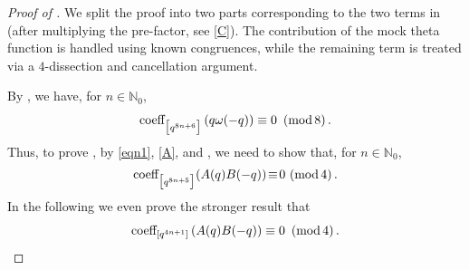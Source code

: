 \documentclass[12pt,reqno]{amsart}
\renewcommand{\o}{{\omega}}
\renewcommand{\(}{\left\(}
\renewcommand{\)}{\right\)}
\newcommand{\os}[2]{\overset{#1}{#2}}
\numberwithin{equation}{section}
\theoremstyle{plain}
\theoremstyle{definition}
\numberwithin{equation}{section}
\renewcommand{\pmod}[1]{\ \left( \mathrm{mod} \, #1 \right)}
\begin{document}
\begin{proof}[Proof of ]
We split the proof into two parts corresponding to the two terms in  (after multiplying the pre-factor, see \eqref{C}). The contribution of the mock theta function is handled using known congruences, while the remaining term is treated via a $4$-dissection and cancellation argument.

 By , we have, for $n\in \mathbb{N}_0$, %
\[\textnormal{coeff}_{\bigl[q^{8n+6}\bigr]}\left(q\o(-q)\right)\equiv 0\pmod{8}.\]
Thus, to prove , by \eqref{eqn1}, \eqref{A}, and , we need to show that, for $n\in \mathbb{N}_0$, %
\begin{align*}%
 \textnormal{coeff}_{\bigl[q^{8n+5}\bigr]}\!\left(A(q)B(-q)\right)\!\equiv\! 0\!\pmod{4}.
\end{align*}
In the following we even prove the stronger result that %
\begin{equation}\label{TSalt}
\textnormal{coeff}_{\left[q^{4n+1}\right]}\left(A(q)B(-q)\right)\equiv 0\pmod{4}.
\end{equation}


\end{proof}
\end{document}
